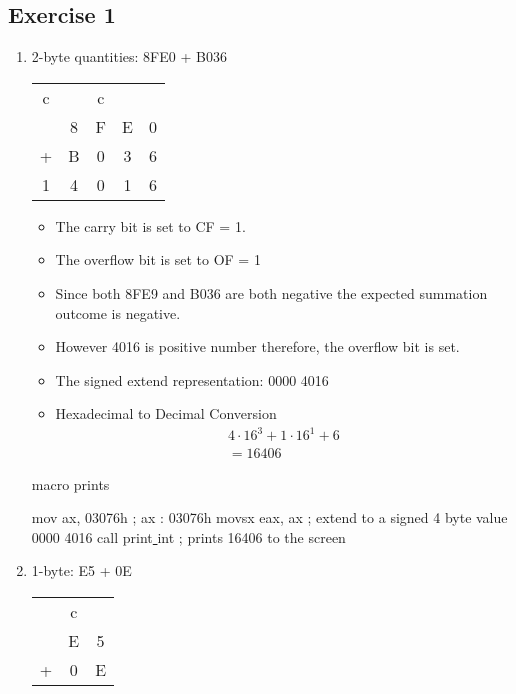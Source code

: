 \documentclass[12pt]{article}
\begin{document}
\subsection*{Exercise 1}
\begin{enumerate}
    \item 2-byte quantities: 8FE0 + B036 
   \begin{center}
        \begin{tabular}{c c c c c}
         c& &c    &    & \\
    &8 & F & E & 0 \\
    + & B & 0 & 3 & 6 \\
    \hline 
    1& 4 & 0 & 1 & 6
    \end{tabular}
   \end{center}
   \begin{itemize}
       \item The carry bit is set to CF = 1. 
       \item The overflow bit is set to OF = 1
       \item Since both 8FE9 and B036 are both negative the expected summation outcome is negative. 
       \item However 4016 is positive number therefore, the overflow bit is set. 
       \item The signed extend representation: 0000 4016
       \item Hexadecimal to Decimal Conversion 
       \begin{align*}
           4 \cdot 16^3 + 1 \cdot 16^1 + 6  \\
           = 16406
       \end{align*}
   \end{itemize}
   \begin{algorithm}
   \caption{macro prints}
   \begin{algorithmic}[1]
    \State mov ax, 03076h ; ax : 03076h
    \State movsx eax, ax ; extend to a signed 4 byte value 0000 4016
    \State call print\underline{ }int ; prints 16406 to the screen
   \end{algorithmic}
   \end{algorithm}
   \item 1-byte: E5 + 0E 
   \begin{center}
       \begin{tabular}{c c c}
       & c & \\
        & E  & 5  \\
        +& 0   & E \\
        \hline 

\end{tabular}
\end{center}
\end{enumerate}
\end{document}
